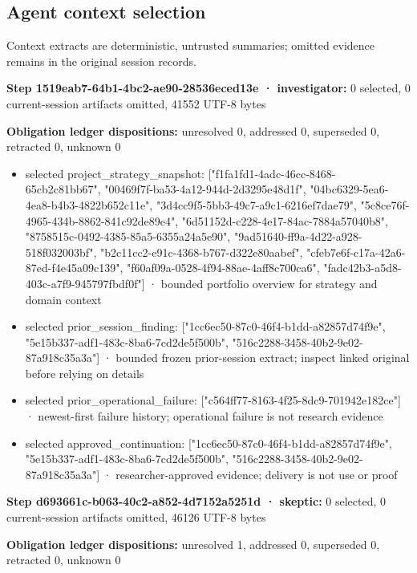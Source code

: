 \documentclass[11pt]{article}
\begin{document}
\subsection{Agent context selection}
Context extracts are deterministic, untrusted summaries; omitted evidence remains in the original session records.\par
\textbf{Step 1519eab7-64b1-4bc2-ae90-28536eced13e · investigator:} 0 selected, 0 current-session artifacts omitted, 41552 UTF-8 bytes\par
\textbf{Obligation ledger dispositions:} unresolved 0, addressed 0, superseded 0, retracted 0, unknown 0\par
\begin{itemize}
\item selected project\_strategy\_snapshot: ["f1fa1fd1-4adc-46cc-8468-65cb2c81bb67", "00469f7f-ba53-4a12-944d-2d3295e48d1f", "04bc6329-5ea6-4ea8-b4b3-4822b652c11e", "3d4cc9f5-5bb3-49c7-a9c1-6216ef7dae79", "5c8ce76f-4965-434b-8862-841c92de89e4", "6d51152d-c228-4e17-84ac-7884a57040b8", "8758515c-0492-4385-85a5-6355a24a5e90", "9ad51640-ff9a-4d22-a928-518f032003bf", "b2c11cc2-e91c-4368-b767-d322e80aabef", "cfeb7e6f-c17a-42a6-87ed-f4e45a09c139", "f60af09a-0528-4f94-88ae-4aff8c700ca6", "fadc42b3-a5d8-403c-a7f9-945797fbdf0f"] · bounded portfolio overview for strategy and domain context
\item selected prior\_session\_finding: ["1cc6ec50-87c0-46f4-b1dd-a82857d74f9e", "5e15b337-adf1-483c-8ba6-7cd2de5f500b", "516c2288-3458-40b2-9e02-87a918c35a3a"] · bounded frozen prior-session extract; inspect linked original before relying on details
\item selected prior\_operational\_failure: ["c564ff77-8163-4f25-8dc9-701942e182ce"] · newest-first failure history; operational failure is not research evidence
\item selected approved\_continuation: ["1cc6ec50-87c0-46f4-b1dd-a82857d74f9e", "5e15b337-adf1-483c-8ba6-7cd2de5f500b", "516c2288-3458-40b2-9e02-87a918c35a3a"] · researcher-approved evidence; delivery is not use or proof
\end{itemize}
\textbf{Step d693661c-b063-40c2-a852-4d7152a5251d · skeptic:} 0 selected, 0 current-session artifacts omitted, 46126 UTF-8 bytes\par
\textbf{Obligation ledger dispositions:} unresolved 1, addressed 0, superseded 0, retracted 0, unknown 0\par
\end{document}
